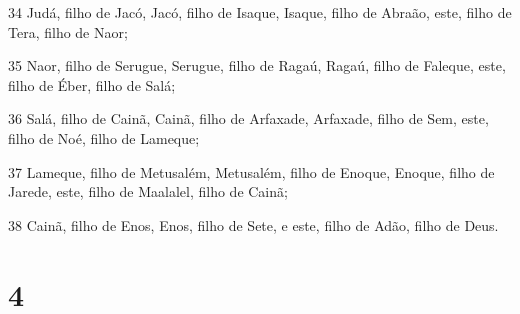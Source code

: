 \par 34 Judá, filho de Jacó, Jacó, filho de Isaque, Isaque, filho de Abraão, este, filho de Tera, filho de Naor;
\par 35 Naor, filho de Serugue, Serugue, filho de Ragaú, Ragaú, filho de Faleque, este, filho de Éber, filho de Salá;
\par 36 Salá, filho de Cainã, Cainã, filho de Arfaxade, Arfaxade, filho de Sem, este, filho de Noé, filho de Lameque;
\par 37 Lameque, filho de Metusalém, Metusalém, filho de Enoque, Enoque, filho de Jarede, este, filho de Maalalel, filho de Cainã;
\par 38 Cainã, filho de Enos, Enos, filho de Sete, e este, filho de Adão, filho de Deus.

\chapter{4}

